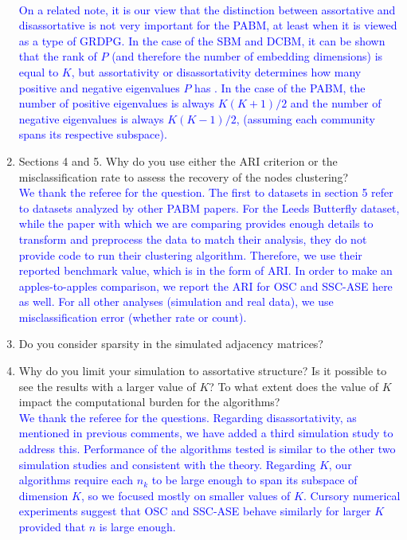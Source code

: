 \documentclass[
]{article}
\begin{document}
\begin{enumerate}
{  }\\
  \textcolor{blue}{
  On a related note, it is our view that the distinction between assortative and disassortative is not very important for the PABM, at least when it is viewed as a type of GRDPG. 
  In the case of the SBM and DCBM, it can be shown that the rank of $P$ (and therefore the number of embedding dimensions) is equal to $K$, but assortativity or disassortativity determines how many positive and negative eigenvalues $P$ has \citep{rubindelanchy2017statistical}. 
  In the case of the PABM, the number of positive eigenvalues is always $K (K + 1) / 2$ and the number of negative eigenvalues is always $K (K - 1) / 2$, (assuming each community spans its respective subspace). 
  }
\item
  Sections 4 and 5. Why do you use either the ARI criterion or the
  misclassification rate to assess the recovery of the nodes
  clustering?\\
  \textcolor{blue}{
  We thank the referee for the question.
  The first to datasets in section 5 refer to datasets analyzed by other PABM papers. 
  For the Leeds Butterfly dataset, while the paper with which we are comparing \citep{noroozi2019estimation} provides enough details to transform and preprocess the data to match their analysis, they do not provide code to run their clustering algorithm. 
  Therefore, we use their reported benchmark value, which is in the form of ARI. 
  In order to make an apples-to-apples comparison, we report the ARI for OSC and SSC-ASE here as well. 
  For all other analyses (simulation and real data), we use misclassification error (whether rate or count). 
  }
\item
  Do you consider sparsity in the simulated adjacency matrices?
\item
  Why do you limit your simulation to assortative structure? Is it
  possible to see the results with a larger value of \(K\)? To what
  extent does the value of \(K\) impact the computational burden for the
  algorithms?\\
  \textcolor{blue}{
  We thank the referee for the questions. 
  Regarding disassortativity, as mentioned in previous comments, we have added a third simulation study to address this. 
  Performance of the algorithms tested is similar to the other two simulation studies and consistent with the theory. 
  Regarding $K$, our algorithms require each $n_k$ to be large enough to span its subspace of dimension $K$, so we focused mostly on smaller values of $K$. 
  Cursory numerical experiments suggest that OSC and SSC-ASE behave similarly for larger $K$ provided that $n$ is large enough. 
}
\end{enumerate}
\end{document}
